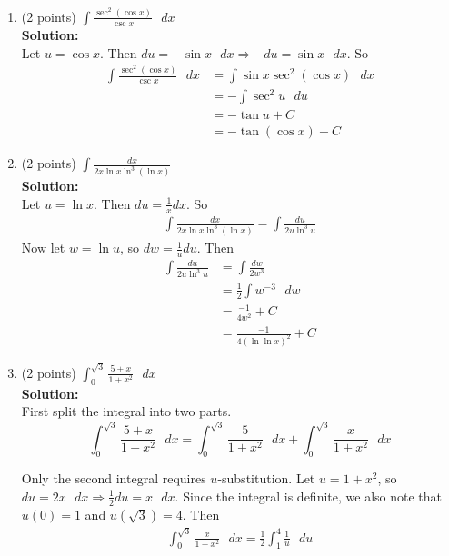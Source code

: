 \documentclass[paper=a4, fontsize=11pt]{scrartcl} %
\numberwithin{equation}{section} %
\numberwithin{figure}{section} %
\numberwithin{table}{section} %
\begin{document}
\begin{enumerate}
\item (2 points) $\displaystyle \int \frac{\sec^2(\cos x)}{\csc x} \text{ } dx$\\
\noindent\textbf{Solution:}\\
Let $u = \cos x$.  Then $du = -\sin x \text{ } dx \Longrightarrow -du = \sin x \text{ } dx$.  So
\begin{align*}
\int \frac{\sec^2(\cos x)}{\csc x} \text{ } dx &= \int \sin x\sec^2(\cos x) \text{ } dx\\
&= - \int \sec^2 u \text{ } du\\
&= - \tan u + C\\
&= \boxed{- \tan(\cos x) + C}
\end{align*}
\vspace{1.5in}
\item (2 points) $\displaystyle \int \frac{dx}{2x\ln x \ln^3(\ln x)}$\\
\noindent\textbf{Solution:}\\
Let $u = \ln x$.  Then $du = \frac{1}{x}dx$.  So
\begin{align*}
\int \frac{dx}{2x\ln x \ln^3(\ln x)} = \int \frac{du}{2u\ln^3u}
\end{align*}
Now let $w = \ln u$, so $dw = \frac{1}{u}du$.  Then
\begin{align*}
\int \frac{du}{2u\ln^3u} &= \int \frac{dw}{2w^3}\\
&= \frac{1}{2}\int w^{-3} \text{ } dw\\
&= \frac{-1}{4w^2}+C\\
&= \boxed{\frac{-1}{4(\ln \ln x)^2} + C}
\end{align*}


\newpage

\item (2 points) $\displaystyle \int_0^{\sqrt{3}} \frac{5+x}{1+x^2} \text{ } dx$\\
\noindent\textbf{Solution:}\\
First split the integral into two parts.
\begin{equation*}
\int_0^{\sqrt{3}} \frac{5+x}{1+x^2} \text{ } dx = \int_0^{\sqrt{3}} \frac{5}{1+x^2} \text{ } dx + \int_0^{\sqrt{3}} \frac{x}{1+x^2} \text{ } dx
\end{equation*}

\noindent Only the second integral requires $u$-substitution.  Let $u = 1 + x^2$, so $du = 2x \text{ } dx \Longrightarrow \frac{1}{2}du = x \text{ } dx$.  Since the integral is definite, we also note that $u(0) = 1$ and $u(\sqrt{3}) = 4$. Then
\begin{align*}
\int_0^{\sqrt{3}} \frac{x}{1+x^2} \text{ } dx = \frac{1}{2}\int_1^4  \frac{1}{u}\text{ } du\\
\end{align*}


\end{enumerate}
\end{document}
